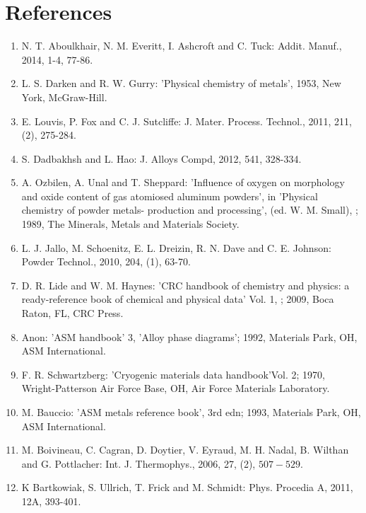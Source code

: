 \documentclass[10pt]{article}
\begin{document}
\section*{References}
\begin{enumerate}
  \item N. T. Aboulkhair, N. M. Everitt, I. Ashcroft and C. Tuck: Addit. Manuf., 2014, 1-4, 77-86.

  \item L. S. Darken and R. W. Gurry: 'Physical chemistry of metals', 1953, New York, McGraw-Hill.

  \item E. Louvis, P. Fox and C. J. Sutcliffe: J. Mater. Process. Technol., 2011, 211, (2), 275-284.

  \item S. Dadbakhsh and L. Hao: J. Alloys Compd, 2012, 541, 328-334.

  \item A. Ozbilen, A. Unal and T. Sheppard: 'Influence of oxygen on morphology and oxide content of gas atomiosed aluminum powders', in 'Physical chemistry of powder metals- production and processing', (ed. W. M. Small), ; 1989, The Minerals, Metals and Materials Society.

  \item L. J. Jallo, M. Schoenitz, E. L. Dreizin, R. N. Dave and C. E. Johnson: Powder Technol., 2010, 204, (1), 63-70.

  \item D. R. Lide and W. M. Haynes: 'CRC handbook of chemistry and physics: a ready-reference book of chemical and physical data' Vol. 1, ; 2009, Boca Raton, FL, CRC Press.

  \item Anon: 'ASM handbook' 3, 'Alloy phase diagrams'; 1992, Materials Park, OH, ASM International.

  \item F. R. Schwartzberg: 'Cryogenic materials data handbook'Vol. 2; 1970, Wright-Patterson Air Force Base, OH, Air Force Materials Laboratory.

  \item M. Bauccio: 'ASM metals reference book', 3rd edn; 1993, Materials Park, OH, ASM International.

  \item M. Boivineau, C. Cagran, D. Doytier, V. Eyraud, M. H. Nadal, B. Wilthan and G. Pottlacher: Int. J. Thermophys., 2006, 27, (2), $507-529$.

  \item K Bartkowiak, S. Ullrich, T. Frick and M. Schmidt: Phys. Procedia A, 2011, 12A, 393-401.


\end{enumerate}
\end{document}
